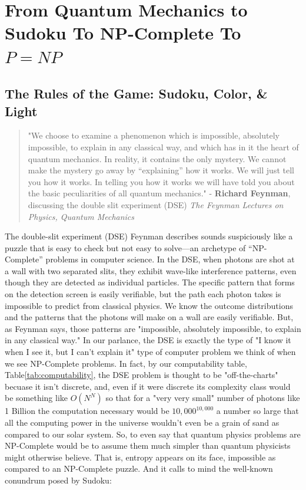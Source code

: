 \documentclass{report}
\begin{document}
\section*{From Quantum Mechanics to Sudoku To NP-Complete To \(P=NP\)}

\subsection*{The Rules of the Game: Sudoku, Color, \& Light}
\begin{quotation}
    "We choose to examine a phenomenon which is impossible, absolutely impossible, to explain in any classical way, and which has in it the heart of quantum mechanics. In reality, it contains the only mystery. We cannot make the mystery go away by “explaining” how it works. We will just tell you how it works. In telling you how it works we will have told you about the basic peculiarities of all quantum mechanics."
    \newline
    - \textbf{Richard Feynman}, discussing the double slit experiment (DSE) \textit{The Feynman Lectures on Physics, Quantum Mechanics}\cite{FeynmanLectures}
\end{quotation}

The double-slit experiment (DSE) Feynman describes sounds suspiciously like a puzzle that is easy to check but not easy to solve—an archetype of “NP-Complete” problems in computer science. In the DSE, when photons are shot at a wall with two separated slits, they exhibit wave-like interference patterns, even though they are detected as individual particles. The specific pattern that forms on the detection screen is easily verifiable, but the path each photon takes is impossible to predict from classical physics. We know the outcome distributions and the patterns that the photons will make on a wall are easily verifiable. But, as Feynman says, those patterns are "impossible, absolutely impossible, to explain in any classical way." In our parlance, the DSE is exactly the type of "I know it when I see it, but I can't explain it" type of computer problem we think of when we see NP-Complete problems. In fact, by our computability table, Table\ref{tab:computability}, the DSE problem is thought to be "off-the-charts" becuase it isn't discrete, and, even if it were discrete its complexity class would be something like $O(N^N)$ so that for a "very very small" number of photons like 1 Billion the computation necessary would be $10,000^{10,000}$ a number so large that all the computing power in the universe wouldn't even be a grain of sand as compared to our solar system. So, to even say that quantum physics problems are NP-Complete would be to assume them much simpler than quantum physicists might otherwise believe. That is, entropy appears on its face, impossible as compared to an \textbf{$\mathrm{NP\text{-}Complete}$} puzzle. And it calls to mind the well-known conundrum posed by Sudoku:
\end{document}
